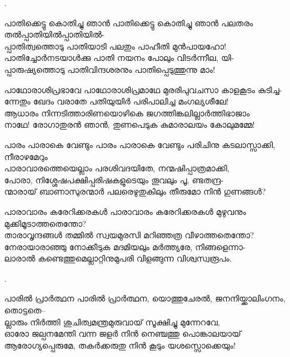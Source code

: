 \begin{enumerate}

.

\begin{slokam}{\VSv}{\KVIT}{പാതിക്കെട്ടു കൊതിച്ചു ഞാൻ}
പാതിക്കെട്ടു കൊതിച്ചു ഞാൻ പലതരം തൽപ്പാതിയിൽപ്പാതിയിൽ-\\
പ്പാതിത്വത്തൊടു പാതിയാടി പലതും പാഹീതി മുൻപായഹോ!\\
പാതിച്ചോർനടയാള്‍ക്കു പാതി നയനം പോലും വിടർന്നീല, യി-\\
പ്പാരുഷ്യത്തൊടു പാതിവിന്ദശരനും പാതിപ്പെടുത്തുന്നു മാം!
\end{slokam}



\begin{slokam}{\VSr}{\Unk}{പാഥോരാശിപ്രഭാവേ}
പാഥോരാശിപ്രമാഥേ മുരരിപുവചസാ കാളകൂടം കുടിച്ച-\\
ന്നേതും ഖേദം വരാതേ പതിയുയിർ പരിപാലിച്ച മംഗല്യശീലേ!  \\
ആധാരം നിന്നടിത്താരിണയൊഴികെ ജഗത്തിങ്കലില്ലാർത്തിഭാജാം \\
നാഥേ! രോഗാതുരൻ ഞാൻ, തുണപെടുക കുമാരാലയം കോലുമമ്മേ!
\end{slokam}


\begin{slokam}{\VSr}{\VNM}{പാരം പാരാകെ വേണ്ടും}
പാരം പാരാകെ വേണ്ടും പരിചിനു കടലാസ്സാക്കി, നീരാഴമേറും\\
പാരാവാരത്തെയെല്ലാം പരശിവദയിതേ, നന്മഷിപ്പാത്രമാക്കി,\\
പോരാ, നിശ്ശേഷപക്ഷിപ്പരിഷകളുടെയും തൂവലും പൂ, ണ്ടതന്ദ്ര-\\
ന്മാരായ്‌ ബാണാസുരന്മാർ പലരെഴുതുകിലും തീരുമോ നിൻ ഗുണങ്ങള്‍?
\end{slokam}


\begin{slokam}{\VSr}{\VCBP}{പാരാവാരം കരേറിക്കരകള്‍}
പാരാവാരം കരേറിക്കരകള്‍ മുഴുവനും മുക്കിമൂടാത്തതെന്തോ?\\
താരാവൃന്ദങ്ങള്‍ തമ്മിൽ സ്വയമുരസി മറിഞ്ഞത്ര വീഴാത്തതെന്തോ?\\
നേരായാരാഞ്ഞു നോക്കീടുക മദമിയലും മർത്ത്യരേ, നിങ്ങളെന്നാ-\\
ലാരാൽ കണ്ടെത്തുമെല്ലാറ്റിനുമുപരി വിളങ്ങുന്ന വിശ്വസ്വരൂപം.
\end{slokam}


.


\begin{slokam}{\VSv}{\UN}{പാരിൽ പ്രാർത്ഥന}
പാരിൽ പ്രാർത്ഥന, യൊത്തുചേരൽ, ജനനിയ്ക്കാലിംഗനം, തൊട്ടതെ--\\
ല്ലാരും നിർത്തി ശുചിത്വമന്ത്രമുരുവായ് സൂക്ഷിച്ചു മുന്നേറവേ,\\
ഓരോ ജല്പനമേന്തി വന്ന ജളർ നിൻ നെഞ്ചത്തു പൊങ്കാലയായ്\\
ആരോഗ്യപ്പെരുമേ, തകർക്കരുതു നിൻ കൂടും യശസ്സൊക്കെയും! 
\end{slokam}


\end{enumerate}
